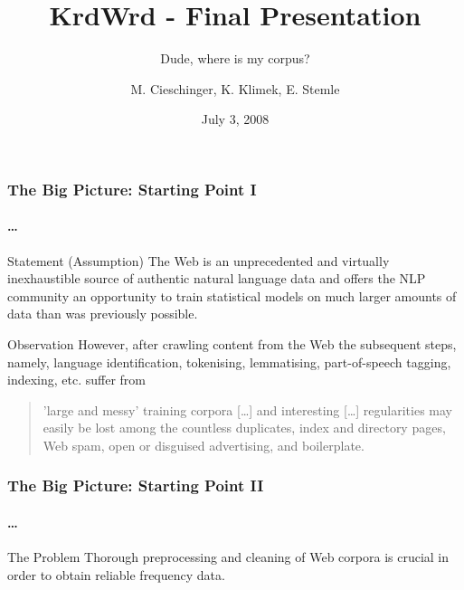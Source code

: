 \documentclass{beamer}
\title{KrdWrd - Final Presentation}
\subtitle{Dude, where is my corpus?}
\author[maria, kilian, egon]{M. Cieschinger, K. Klimek, E. Stemle}
\institute[UOS, pNLP]{Uni Osnabr\"uck, Practical NLP}
\date{July 3, 2008}
\begin{document}
\begin{frame}
	\titlepage
\end{frame}



\begin{frame}
\frametitle{The Big Picture: Starting Point I}
\framesubtitle{\hfill {\tiny \cite{Evert2008,FIASCO2007}\ldots}}

	\begin{block}{Statement (Assumption)}
		The Web is an unprecedented and virtually inexhaustible source of authentic natural language data and offers the NLP community an opportunity to train statistical models on much larger amounts of data than was previously possible.
	\end{block}

\pause

	\begin{block}{Observation}
		However, after crawling content from the Web the subsequent steps, namely, language identification, tokenising, lemmatising, part-of-speech tagging, indexing, etc. suffer from 
		\begin{quote} 'large and messy' training corpora [\ldots] and interesting [\ldots] regularities may easily be lost among the countless duplicates, index and directory pages, Web spam, open or disguised advertising, and boilerplate.
		\end{quote}
	\end{block}
\end{frame}


\begin{frame}
\frametitle{The Big Picture: Starting Point II}
\framesubtitle{\hfill {\tiny \cite{Evert2008,FIASCO2007}\ldots}}
	
	\begin{block}{The Problem}
		Thorough preprocessing and cleaning of Web corpora is crucial in order to obtain reliable frequency data.
	\end{block}
	
\end{frame}
\end{document}
